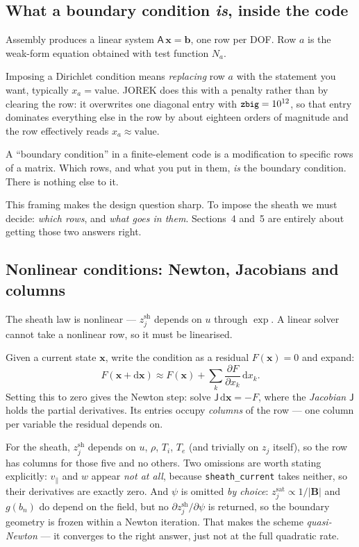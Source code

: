 \documentclass[11pt,a4paper]{article}
\newcommand{\zj}{z_j}
\newcommand{\zjsat}{z^{\mathrm{sat}}_{j}}
\newcommand{\zjsh}{z^{\mathrm{sh}}_{j}}
\newcommand{\dd}{\mathrm{d}}
\newcommand{\code}[1]{\texttt{\small #1}}
\begin{document}
\subsection{What a boundary condition \emph{is}, inside the code}

Assembly produces a linear system $\mathsf{A}\,\bm{x} = \bm{b}$, one row per DOF. Row $a$ is the
weak-form equation obtained with test function $N_a$.

Imposing a Dirichlet condition means \emph{replacing} row $a$ with the statement you want, typically
$x_a = \text{value}$. JOREK does this with a penalty rather than by clearing the row: it overwrites
one diagonal entry with $\code{zbig}=10^{12}$, so that entry dominates everything else in the row by
about eighteen orders of magnitude and the row effectively reads $x_a\approx\text{value}$.

\begin{plain}
A ``boundary condition'' in a finite-element code is a modification to specific rows of a matrix.
Which rows, and what you put in them, \emph{is} the boundary condition. There is nothing else to it.
\end{plain}

This framing makes the design question sharp. To impose the sheath we must decide: \emph{which rows},
and \emph{what goes in them}. Sections~4 and~5 are entirely about getting those two answers right.

\subsection{Nonlinear conditions: Newton, Jacobians and columns}

The sheath law is nonlinear --- $\zjsh$ depends on $u$ through $\exp$. A linear solver cannot take a
nonlinear row, so it must be linearised.

Given a current state $\bm{x}$, write the condition as a residual $F(\bm{x})=0$ and expand:
\begin{equation}
  F(\bm{x} + \dd\bm{x}) \approx F(\bm{x}) + \sum_k \frac{\partial F}{\partial x_k}\,\dd x_k .
\end{equation}
Setting this to zero gives the Newton step: solve $\mathsf{J}\,\dd\bm{x} = -F$, where the
\emph{Jacobian} $\mathsf{J}$ holds the partial derivatives. Its entries occupy \emph{columns} of the
row --- one column per variable the residual depends on.

For the sheath, $\zjsh$ depends on $u$, $\rho$, $T_i$, $T_e$ (and trivially on $\zj$ itself), so the
row has columns for those five and no others. Two omissions are worth stating explicitly:
$v_\parallel$ and $w$ appear \emph{not at all}, because \code{sheath\_current} takes neither, so their
derivatives are exactly zero. And $\psi$ is omitted \emph{by choice}: $\zjsat\propto1/|\bm{B}|$ and
$g(b_n)$ do depend on the field, but no $\partial\zjsh/\partial\psi$ is returned, so the boundary
geometry is frozen within a Newton iteration. That makes the scheme \emph{quasi-Newton} --- it
converges to the right answer, just not at the full quadratic rate.
\end{document}
